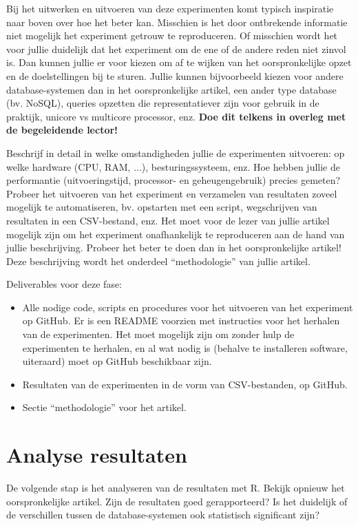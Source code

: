 \documentclass[fleqn,10pt]{voorstel}
\begin{document}
Bij het uitwerken en uitvoeren van deze experimenten komt typisch inspiratie naar boven over hoe het beter kan. Misschien is het door ontbrekende informatie niet mogelijk het experiment getrouw te reproduceren. Of misschien wordt het voor jullie duidelijk dat het experiment om de ene of de andere reden niet zinvol is. Dan kunnen jullie er voor kiezen om af te wijken van het oorspronkelijke opzet en de doelstellingen bij te sturen. Jullie kunnen bijvoorbeeld kiezen voor andere database-systemen dan in het oorspronkelijke artikel, een ander type database (bv. NoSQL), queries opzetten die representatiever zijn voor gebruik in de praktijk, unicore vs multicore processor, enz. \textbf{Doe dit telkens in overleg met de begeleidende lector!}

Beschrijf in detail in welke omstandigheden jullie de experimenten uitvoeren: op welke hardware (CPU, RAM, ...), besturingssysteem, enz. Hoe hebben jullie de performantie (uitvoeringstijd, processor- en geheugengebruik) precies gemeten? Probeer het uitvoeren van het experiment en verzamelen van resultaten zoveel mogelijk te automatiseren, bv. opstarten met een script, wegschrijven van resultaten in een CSV-bestand, enz. Het moet voor de lezer van jullie artikel mogelijk zijn om het experiment onafhankelijk te reproduceren aan de hand van jullie beschrijving. Probeer het beter te doen dan in het oorspronkelijke artikel! Deze beschrijving wordt het onderdeel ``methodologie'' van jullie artikel.

Deliverables voor deze fase:

\begin{itemize}
  \item Alle nodige code, scripts en procedures voor het uitvoeren van het experiment op GitHub. Er is een README voorzien met instructies voor het herhalen van de experimenten. Het moet mogelijk zijn om zonder hulp de experimenten te herhalen, en al wat nodig is (behalve te installeren software, uiteraard) moet op GitHub beschikbaar zijn.
  \item Resultaten van de experimenten in de vorm van CSV-bestanden, op GitHub.
  \item Sectie ``methodologie'' voor het artikel.
\end{itemize}

\section{Analyse resultaten}

De volgende stap is het analyseren van de resultaten met R. Bekijk opnieuw het oorspronkelijke artikel. Zijn de resultaten goed gerapporteerd? Is het duidelijk of de verschillen tussen de database-systemen ook statistisch significant zijn?
\end{document}

